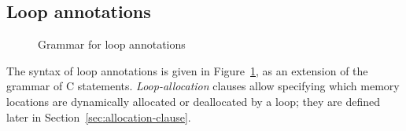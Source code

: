 \subsection{Loop annotations}
\label{sec:loop_annot}

\begin{figure}[t]
  \begin{cadre}
    
  \end{cadre}
  \caption{Grammar for loop annotations}
  \label{fig:gram:loops}
\end{figure}

The syntax of loop annotations is given in Figure~\ref{fig:gram:loops},
as an extension of the grammar of C statements.
\textsl{Loop-allocation} clauses allow specifying which memory locations 
are dynamically allocated or deallocated by a loop; 
they are defined later in Section~\ref{sec:allocation-clause}.

